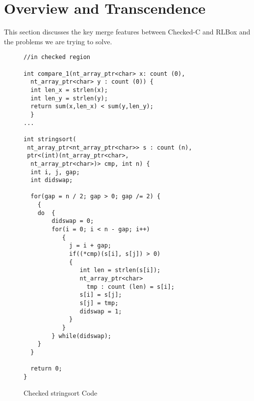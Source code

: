 \section{Overview and Transcendence}\label{sec:overview}

This section discusses the key merge features between Checked-C and RLBox and the problems we are trying to solve.



\begin{figure}[t]
{\small
  \begin{lstlisting}[xleftmargin=4 mm]
//in checked region

int compare_1(nt_array_ptr<char> x: count (0),
  nt_array_ptr<char> y : count (0)) { 
  int len_x = strlen(x);
  int len_y = strlen(y);
  return sum(x,len_x) < sum(y,len_y);
  }
...

int stringsort(
 nt_array_ptr<nt_array_ptr<char>> s : count (n),
 ptr<(int)(nt_array_ptr<char>,
  nt_array_ptr<char>)> cmp, int n) {
  int i, j, gap;
  int didswap;
 
  for(gap = n / 2; gap > 0; gap /= 2) {
    {
    do  {
        didswap = 0;
        for(i = 0; i < n - gap; i++)
           {
             j = i + gap;
             if((*cmp)(s[i], s[j]) > 0)
             {
                int len = strlen(s[i]);
                nt_array_ptr<char> 
                  tmp : count (len) = s[i];
                s[i] = s[j];
                s[j] = tmp;
                didswap = 1;
             }
           }
        } while(didswap);
    }
  }

  return 0;
}
  \end{lstlisting}
}
\caption{Checked stringsort Code}
\label{fig:checkedc-example-1}
\end{figure}

